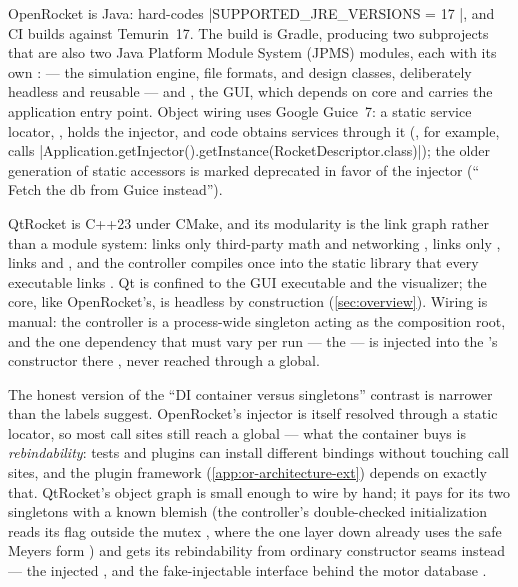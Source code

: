 OpenRocket is Java:  hard-codes
\cppinline|SUPPORTED_JRE_VERSIONS = { 17 }|, and CI builds against Temurin~17. The build is
Gradle, producing two subprojects that are also two Java Platform Module System (JPMS)
modules, each with its own :  --- the
simulation engine, file formats, and design classes, deliberately headless and reusable ---
and , the GUI, which depends on core and carries the application
entry point. Object wiring uses Google Guice~7: a static service locator,
, holds the injector, and code obtains
services through it (, for example, calls
\cppinline|Application.getInjector().getInstance(RocketDescriptor.class)|); the older
generation of static accessors is marked deprecated in favor of the injector
(`` Fetch the db from Guice instead'').

QtRocket is C++23  under CMake, and its modularity is the link graph
rather than a module system:  links only third-party math and networking
,  links only 
,  links  and 
, and the controller compiles once into the
 static library that every executable links .
Qt is confined to the GUI executable and the visualizer; the core, like OpenRocket's, is
headless by construction (\cref{sec:overview}). Wiring is manual: the controller is a
process-wide singleton  acting as the composition root, and the one
dependency that must vary per run --- the  --- is injected into the
's constructor there , never reached through a
global.

The honest version of the ``DI container versus singletons'' contrast is narrower than the
labels suggest. OpenRocket's injector is itself resolved through a static locator, so most
call sites still reach a global --- what the container buys is \emph{rebindability}: tests
and plugins can install different bindings without touching call sites, and the plugin
framework (\cref{app:or-architecture-ext}) depends on exactly that. QtRocket's object graph
is small enough to wire by hand; it pays for its two singletons with a known blemish (the
controller's double-checked initialization reads its flag outside the mutex
, where the  one layer down already uses the safe Meyers
form ) and gets its rebindability from ordinary constructor
seams instead --- the injected , and the fake-injectable
 interface behind the motor database .


